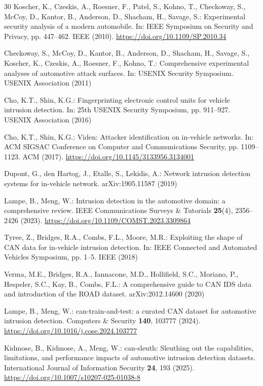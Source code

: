 \documentclass[runningheads]{llncs}
\providecommand{\doi}[1]{\url{https://doi.org/#1}}
\begin{document}
\begin{thebibliography}{30}
Koscher, K., Czeskis, A., Roesner, F., Patel, S., Kohno, T., Checkoway, S., McCoy, D., Kantor, B., Anderson, D., Shacham, H., Savage, S.: Experimental security analysis of a modern automobile. In: IEEE Symposium on Security and Privacy, pp. 447--462. IEEE (2010). \doi{10.1109/SP.2010.34}

Checkoway, S., McCoy, D., Kantor, B., Anderson, D., Shacham, H., Savage, S., Koscher, K., Czeskis, A., Roesner, F., Kohno, T.: Comprehensive experimental analyses of automotive attack surfaces. In: USENIX Security Symposium. USENIX Association (2011)

Cho, K.T., Shin, K.G.: Fingerprinting electronic control units for vehicle intrusion detection. In: 25th USENIX Security Symposium, pp. 911--927. USENIX Association (2016)

Cho, K.T., Shin, K.G.: Viden: Attacker identification on in-vehicle networks. In: ACM SIGSAC Conference on Computer and Communications Security, pp. 1109--1123. ACM (2017). \doi{10.1145/3133956.3134001}

Dupont, G., den Hartog, J., Etalle, S., Lekidis, A.: Network intrusion detection systems for in-vehicle network. arXiv:1905.11587 (2019)

Lampe, B., Meng, W.: Intrusion detection in the automotive domain: a comprehensive review. IEEE Communications Surveys \& Tutorials \textbf{25}(4), 2356--2426 (2023). \doi{10.1109/COMST.2023.3309864}

Tyree, Z., Bridges, R.A., Combs, F.L., Moore, M.R.: Exploiting the shape of CAN data for in-vehicle intrusion detection. In: IEEE Connected and Automated Vehicles Symposium, pp. 1--5. IEEE (2018)

Verma, M.E., Bridges, R.A., Iannacone, M.D., Hollifield, S.C., Moriano, P., Hespeler, S.C., Kay, B., Combs, F.L.: A comprehensive guide to CAN IDS data and introduction of the ROAD dataset. arXiv:2012.14600 (2020)

Lampe, B., Meng, W.: can-train-and-test: a curated CAN dataset for automotive intrusion detection. Computers \& Security \textbf{140}, 103777 (2024). \doi{10.1016/j.cose.2024.103777}

Kidmose, B., Kidmose, A., Meng, W.: can-sleuth: Sleuthing out the capabilities, limitations, and performance impacts of automotive intrusion detection datasets. International Journal of Information Security \textbf{24}, 193 (2025). \doi{10.1007/s10207-025-01038-8}


\end{thebibliography}
\end{document}
